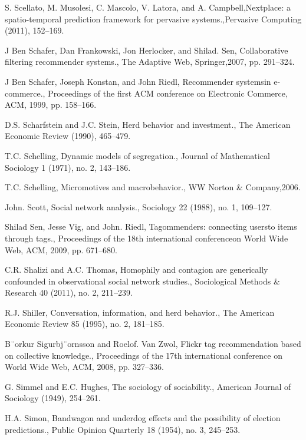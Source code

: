 \begin{thebibliography}{999}
 S. Scellato, M. Musolesi, C. Mascolo, V. Latora, and A. Campbell,Nextplace: a spatio-temporal prediction framework for pervasive systems.,Pervasive Computing (2011), 152–169.

 J Ben Schafer, Dan Frankowski, Jon Herlocker, and Shilad. Sen, Collaborative filtering recommender systems., The Adaptive Web, Springer,2007, pp. 291–324.

 J Ben Schafer, Joseph Konstan, and John Riedl, Recommender systemsin e-commerce., Proceedings of the first ACM conference on Electronic Commerce, ACM, 1999, pp. 158–166.

 D.S. Scharfstein and J.C. Stein, Herd behavior and investment., The American Economic Review (1990), 465–479.

 T.C. Schelling, Dynamic models of segregation., Journal of Mathematical Sociology 1 (1971), no. 2, 143–186.

 T.C. Schelling, Micromotives and macrobehavior., WW Norton \& Company,2006.

 John. Scott, Social network analysis., Sociology 22 (1988), no. 1, 109–127.

 Shilad Sen, Jesse Vig, and John. Riedl, Tagommenders: connecting usersto items through tags., Proceedings of the 18th international conferenceon World Wide Web, ACM, 2009, pp. 671–680.

 C.R. Shalizi and A.C. Thomas, Homophily and contagion are generically confounded in observational social network studies., Sociological Methods \& Research 40 (2011), no. 2, 211–239.

 R.J. Shiller, Conversation, information, and herd behavior., The American Economic Review 85 (1995), no. 2, 181–185.

 B¨orkur Sigurbj¨ornsson and Roelof. Van Zwol, Flickr tag recommendation based on collective knowledge., Proceedings of the 17th international conference on World Wide Web, ACM, 2008, pp. 327–336.

 G. Simmel and E.C. Hughes, The sociology of sociability., American Journal of Sociology (1949), 254–261.

 H.A. Simon, Bandwagon and underdog effects and the possibility of election predictions., Public Opinion Quarterly 18 (1954), no. 3, 245–253.


\end{thebibliography}
